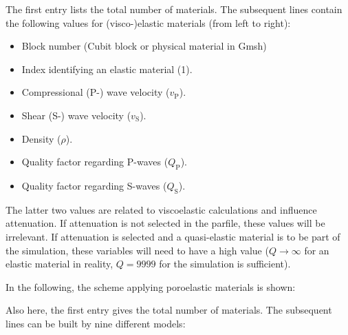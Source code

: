 		\medskip
    		The first entry lists the total number of materials. 
    		The subsequent lines contain the following values for (visco-)elastic materials (from left to right):
    		\begin{itemize}
    			\item Block number (Cubit block or physical material in Gmsh)
    			\item Index identifying an elastic material (1).
    			\item Compressional (P-) wave velocity ($v_\mathrm{P}$).
    			\item Shear (S-) wave velocity ($v_\mathrm{S}$).
    			\item Density ($\rho$).
    			\item Quality factor regarding P-waves ($Q_\mathrm{P}$).
    			\item Quality factor regarding S-waves ($Q_\mathrm{S}$). 
    		\end{itemize}
    		The latter two values are related to viscoelastic calculations and influence attenuation. If attenuation is not selected in the parfile, these values will be irrelevant. If attenuation is selected and a quasi-elastic material is to be part of the simulation, these variables will need to have a high value ($Q \rightarrow \infty$ for an elastic material in reality, $Q=9999$ for the simulation is sufficient).

		\medskip

			\medskip  
  			In the following, the scheme applying poroelastic materials is shown:
  			
		    
		    Also here, the first entry gives the total number of materials. The subsequent lines can be built by nine different models: 
		    
